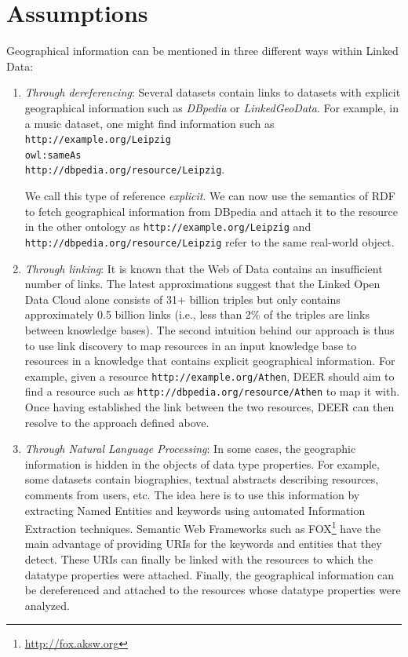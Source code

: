 \documentclass[a4paper,twoside,bibtotoc,abstracton,12pt,BCOR=15mm]{article}
\newcommand{\geolift}{\textsc{DEER}\xspace}
\begin{document}
\section{Assumptions}
Geographical information can be mentioned in three different ways within Linked Data:
\begin{enumerate}
\item \emph{Through dereferencing}: Several datasets contain links to datasets with explicit geographical information such as \emph{DBpedia} or \emph{LinkedGeoData}. 
For example, in a music dataset, one might find information such as\\ 
\texttt{http://example.org/Leipzig \\
owl:sameAs \\ 
http://dbpedia.org/resource/Leipzig}.

We call this type of reference \emph{explicit}. 
We can now use the semantics of RDF to fetch geographical information from DBpedia and attach it to the resource in the other ontology as \texttt{http://example.org/Leipzig} and \texttt{http://dbpedia.org/resource/Leipzig} refer to the same real-world object.

\item \emph{Through linking}: It is known that the Web of Data contains an insufficient number of links. 
The latest approximations suggest that the Linked Open Data Cloud alone consists of 31+ billion triples but only contains approximately 0.5 billion links (i.e., less than 2\% of the triples are links between knowledge bases). 
The second intuition behind our approach is thus to use link discovery to map resources in an input knowledge base to resources in a knowledge that contains explicit geographical information. 
For example, given a resource \texttt{http://example.org/Athen}, \geolift should aim to find a resource such as \texttt{http://dbpedia.org/resource/Athen} to map it with. 
Once having established the link between the two resources, \geolift can then resolve to the approach defined above.

\item \emph{Through Natural Language Processing}: In some cases, the geographic information is hidden in the objects of data type properties. 
For example, some datasets contain biographies, textual abstracts describing resources, comments from users, etc.
The idea here is to use this information by extracting Named Entities and keywords using automated Information Extraction techniques.
Semantic Web Frameworks such as FOX\footnote{\url{http://fox.aksw.org}} have the main advantage of providing URIs for the keywords and entities that they detect.
These URIs can finally be linked with the resources to which the datatype properties were attached.
Finally, the geographical information can be dereferenced and attached to the resources whose datatype properties were analyzed.
\end{enumerate}
\end{document}
